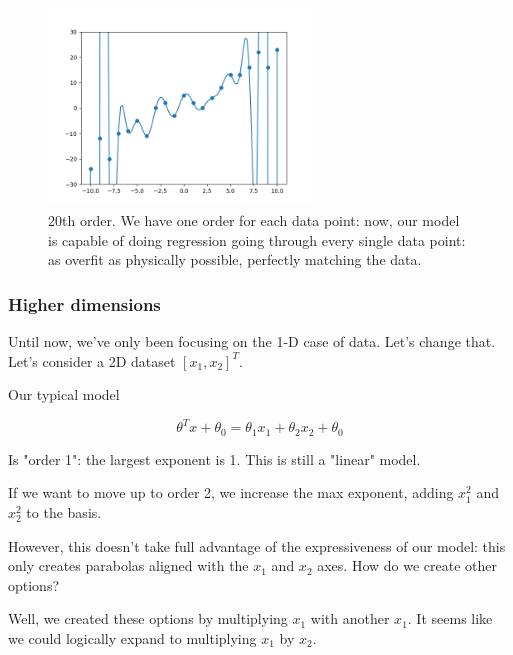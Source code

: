                  \begin{figure}[H]
                    \centering
                    
                    \includegraphics[width=70mm,scale=0.5]{images/feature_images/order_20_soln.png}
                    \caption*{20th order. We have one order for each data point: now, our model is capable of doing regression going through every single data point: as overfit as physically possible, perfectly matching the data.}
                \end{figure}

            \subsecdiv
            \subsubsection*{Higher dimensions}

                Until now, we've only been focusing on the 1-D case of data. Let's change that. Let's consider a 2D dataset $[x_1,x_2]^T$.

                Our typical model

                \begin{equation}
                    \theta^Tx + \theta_0 = \theta_1x_1 + \theta_2x_2 + \theta_0
                \end{equation}

                Is "order 1": the largest exponent is 1. This is still a "linear" model. 

                If we want to move up to order 2, we increase the max exponent, adding $x_1^2$ and $x_2^2$ to the basis.

                However, this doesn't take full advantage of the expressiveness of our model: this only creates parabolas aligned with the $x_1$ and $x_2$ axes. How do we create other options?

                Well, we created these options by multiplying $x_1$ with another $x_1$. It seems like we could logically expand to multiplying $x_1$ by $x_2$.\\

